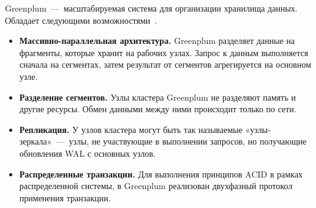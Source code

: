 Greenplum~---~масштабируемая система для организации хранилища данных.  Обладает следующими возможностями~\cite{lyu2021greenplum}.

\begin{itemize}
	\item \textbf{Массивно-параллельная архитектура.} Greenplum разделяет данные на фрагменты, которые хранит на рабочих узлах. Запрос к данным выполняется сначала на сегментах, затем результат от сегментов агрегируется на основном узле.
	\item \textbf{Разделение сегментов.} Узлы кластера Greenplum не разделяют память и другие ресурсы. Обмен данными между ними происходит только по сети.
	\item \textbf{Репликация.} У узлов кластера могут быть так называемые «узлы-зеркала»~---~узлы, не участвующие в выполнении запросов, но получающие обновления WAL с основных узлов.
	\item \textbf{Распределенные транзакции.} Для выполнения принципов ACID в рамках распределенной системы, в Greenplum реализован двухфазный протокол применения транзакции.
\end{itemize}


